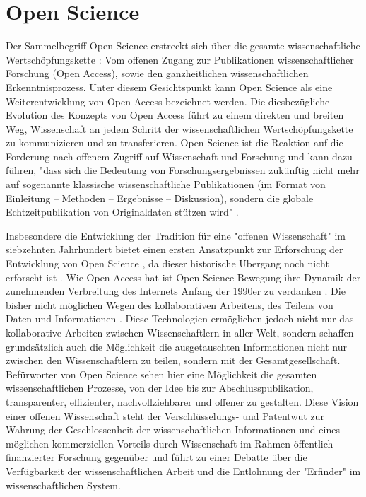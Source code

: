 \section{Open Science}
Der Sammelbegriff Open Science erstreckt sich über die gesamte wissenschaftliche Wertschöpfungskette \cite{Scheliga_2014}: Vom offenen Zugang zur Publikationen wissenschaftlicher Forschung (Open Access), sowie den ganzheitlichen wissenschaftlichen Erkenntnisprozess. Unter diesem Gesichtspunkt kann Open Science als eine Weiterentwicklung von Open Access bezeichnet werden. Die diesbezügliche Evolution des Konzepts von Open Access führt zu einem direkten und breiten Weg, Wissenschaft an jedem Schritt der wissenschaftlichen Wertschöpfungskette zu kommunizieren und zu transferieren. Open Science ist die Reaktion auf die Forderung nach offenem Zugriff auf Wissenschaft und Forschung und kann dazu führen, "dass sich die Bedeutung von Forschungsergebnissen zukünftig nicht mehr auf sogenannte klassische wissenschaftliche Publikationen (im Format von Einleitung – Methoden – Ergebnisse – Diskussion), sondern die globale Echtzeitpublikation von Originaldaten stützen wird" \cite{Stengel_2013}.

Insbesondere die Entwicklung der Tradition für eine "offenen Wissenschaft" im siebzehnten Jahrhundert bietet einen ersten Ansatzpunkt zur Erforschung der Entwicklung von Open Science \cite{Scheliga_2014}, da dieser historische Übergang noch nicht erforscht ist \cite{CREATe_2014}. Wie Open Access hat ist Open Science Bewegung ihre Dynamik der zunehmenden Verbreitung des Internets Anfang der 1990er zu verdanken \cite{Lievrouw_2010}. Die bisher nicht möglichen Wegen des kollaborativen Arbeitens, des Teilens von Daten und Informationen \cite{Meyer_2013}. Diese Technologien ermöglichen jedoch nicht nur das kollaborative Arbeiten zwischen Wissenschaftlern in aller Welt, sondern schaffen grundsätzlich auch die Möglichkeit die ausgetauschten Informationen nicht nur zwischen den Wissenschaftlern zu teilen, sondern mit der Gesamtgesellschaft. Befürworter von Open Science sehen hier eine Möglichkeit die gesamten wissenschaftlichen Prozesse, von der Idee bis zur Abschlusspublikation, transparenter, effizienter, nachvollziehbarer und offener zu gestalten. Diese Vision einer offenen Wissenschaft steht der Verschlüsselungs- und Patentwut zur Wahrung der Geschlossenheit der wissenschaftlichen Informationen und eines möglichen kommerziellen Vorteils durch Wissenschaft im Rahmen öffentlich-finanzierter Forschung gegenüber und führt zu einer Debatte über die Verfügbarkeit der wissenschaftlichen Arbeit und die Entlohnung der "Erfinder" im wissenschaftlichen System.

